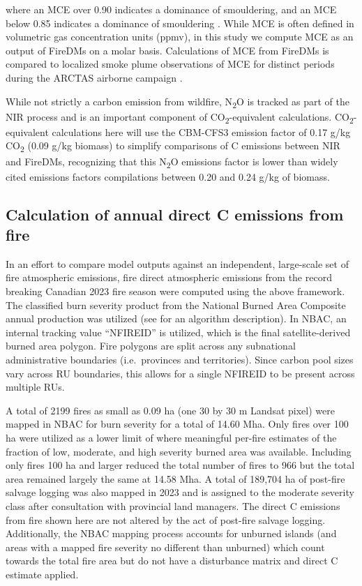 \documentclass[, manuscript]{copernicus}
\begin{document}
where an MCE over 0.90 indicates a dominance of smouldering, and an MCE
below 0.85 indicates a dominance of smouldering \citep{akagi2011}. While
MCE is often defined in volumetric gas concentration units (ppmv), in
this study we compute MCE as an output of FireDMs on a molar basis.
Calculations of MCE from FireDMs is compared to localized smoke plume
observations of MCE for distinct periods during the ARCTAS airborne
campaign \citep{hornbrook2011}.

While not strictly a carbon emission from wildfire, N\textsubscript{2}O
is tracked as part of the NIR process and is an important component of
CO\textsubscript{2}-equivalent calculations.
CO\textsubscript{2}-equivalent calculations here will use the CBM-CFS3
emission factor of 0.17 g/kg CO\textsubscript{2} (0.09 g/kg biomass) to
simplify comparisons of C emissions between NIR and FireDMs, recognizing
that this N\textsubscript{2}O emissions factor is lower than widely
cited emissions factors compilations
\citep{binteshahidNEIVAv10NextgenerationEmissions2024, andreaeEmissionTraceGases2019}
between 0.20 and 0.24 g/kg of biomass.

\subsection{Calculation of annual direct C emissions from fire}

In an effort to compare model outputs against an independent,
large-scale set of fire atmospheric emissions, fire direct atmospheric
emissions from the record breaking Canadian 2023 fire season were
computed using the above framework. The classified burn severity product
from the National Burned Area Composite annual production was utilized
(see \citet{hall2020} for an algorithm description). In NBAC, an
internal tracking value ``NFIREID'' is utilized, which is the final
satellite-derived burned area polygon. Fire polygons are split across
any subnational administrative boundaries (i.e.~provinces and
territories). Since carbon pool sizes vary across RU boundaries, this
allows for a single NFIREID to be present across multiple RUs.

A total of 2199 fires as small as 0.09 ha (one 30 by 30 m Landsat pixel)
were mapped in NBAC for burn severity for a total of 14.60 Mha. Only
fires over 100 ha were utilized as a lower limit of where meaningful
per-fire estimates of the fraction of low, moderate, and high severity
burned area was available. Including only fires 100 ha and larger
reduced the total number of fires to 966 but the total area remained
largely the same at 14.58 Mha. A total of 189,704 ha of post-fire
salvage logging was also mapped in 2023 and is assigned to the moderate
severity class after consultation with provincial land managers. The
direct C emissions from fire shown here are not altered by the act of
post-fire salvage logging. Additionally, the NBAC mapping process
accounts for unburned islands (and areas with a mapped fire severity no
different than unburned) which count towards the total fire area but do
not have a disturbance matrix and direct C estimate applied.
\end{document}
